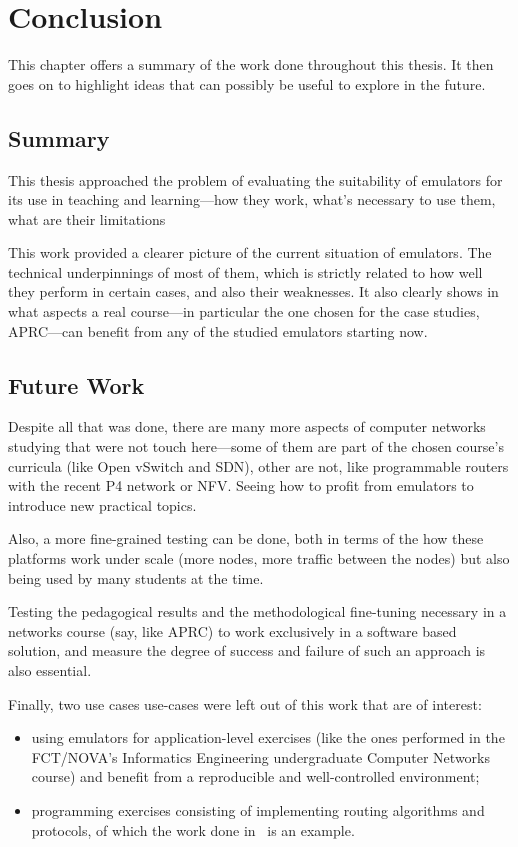 
\chapter{Conclusion}
\label{ch:conclusion}

This chapter offers a summary of the work done throughout this thesis.
It then goes on to highlight ideas that can possibly be useful to explore in the future.

\section{Summary}

This thesis approached the problem of evaluating the suitability of emulators for its use in teaching and learning---how they work, what's necessary to use them, what are their limitations\textellipsis

This work provided a clearer picture of the current situation of emulators.
The technical underpinnings of most of them, which is strictly related to how well they perform in certain cases, and also their weaknesses.
It also clearly shows in what aspects a real course---in particular the one chosen for the case studies, APRC---can benefit from any of the studied emulators starting now.

\section{Future Work}

Despite all that was done, there are many more aspects of computer networks studying that were not touch here---some of them are part of the chosen course's curricula (like Open vSwitch and SDN), other are not, like programmable routers with the recent P4 network or NFV.
Seeing how to profit from emulators to introduce new practical topics.

Also, a more fine-grained testing can be done, both in terms of the how these platforms work under scale (more nodes, more traffic between the nodes) but also being used by many students at the time.

Testing the pedagogical results and the methodological fine-tuning necessary in a networks course (say, like APRC) to work exclusively in a software based solution, and measure the degree of success and failure of such an approach is also essential.

Finally, two use cases use-cases were left out of this work that are of interest:
\begin{itemize}
  \item using emulators for application-level exercises (like the ones performed in the FCT/NOVA's Informatics Engineering undergraduate Computer Networks course) and benefit from a reproducible and well-controlled environment;
  \item programming exercises consisting of implementing routing algorithms and protocols, of which the work done in~\cite{teachandlearnmininet} is an example.
\end{itemize}

